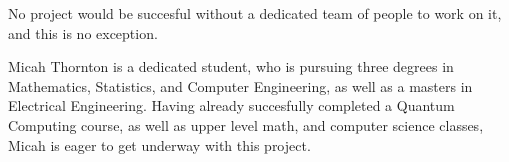 No project would be succesful without a dedicated team of people to work on it, and this is no exception. 

Micah Thornton is a dedicated student, who is pursuing three degrees in Mathematics, Statistics, and Computer Engineering, as well as a masters in Electrical Engineering. Having already succesfully completed a Quantum Computing course, as well as upper level math, and computer science classes, Micah is eager to get underway with this project. 